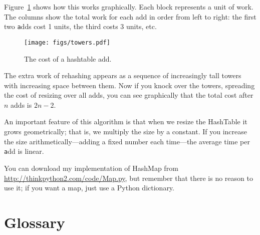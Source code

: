 \documentclass[
DIV=11,
fontsize=13,
twoside,
headinclude=false,
titlepage=firstiscover,
abstract=true,
headsepline=true,
footsepline=true,
chapterprefix=true, %
headings=big,
bibliography=totoc,%
captions=tableheading
]{scrbook}
\theoremstyle{definition}
\begin{document}
Figure~\ref{fig.hash} shows how this works graphically.  Each
block represents a unit of work.  The columns show the total
work for each add in order from left to right: the first two
{\texttt adds} cost 1 units, the third costs 3 units, etc.

\begin{figure}
\centerline{\texttt{[image: figs/towers.pdf]}}
\caption{The cost of a hashtable add.\label{fig.hash}}
\end{figure}

The extra work of rehashing appears as a sequence of increasingly
tall towers with increasing space between them.  Now if you knock
over the towers, spreading the cost of resizing over all
adds, you can see graphically that the total cost after $n$
adds is $2n - 2$.

An important feature of this algorithm is that when we resize the
HashTable it grows geometrically; that is, we multiply the size by a
constant.  If you increase the size
arithmetically---adding a fixed number each time---the average time
per {\texttt add} is linear.

You can download my implementation of HashMap from
\url{http://thinkpython2.com/code/Map.py}, but remember that there
is no reason to use it; if you want a map, just use a Python dictionary.

\section{Glossary}
\end{document}
